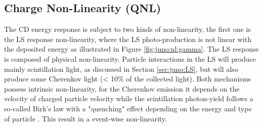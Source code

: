 \documentclass[../main.tex]{subfiles}
\begin{document}
%
%
%
%
%
%

\subsection{Charge Non-Linearity (QNL)}
\label{sec:joint_fit:qnl}

The CD energy response is subject to two kinds of non-linearity, the first one is the LS response non-linearity, where the LS photo-production is not linear with the deposited energy as illustrated in Figure \ref{fig:juno:nl:gamma}. The LS response is composed of physical non-linearity. Particle interactions in the LS will produce mainly scintillation light, as discussed in Section \ref{sec:juno:LS}, but will also produce some Cherenkov light (< 10\% of the collected light). Both mechanisms possess intrinsic non-linearity, for the Cherenkov emission it depends on the velocity of charged particle velocity while the scintillation photon-yield follows a so-called Birk's law with a "quenching" effect depending on the energy and type of particle \cite{particle_data_group_review_2020}. This result in a event-wise non-linearity.
\end{document}
